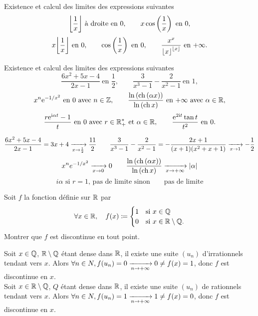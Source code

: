 \documentclass{magnolia}
\begin{document}

Existence et calcul des limites des expressions suivantes
\[\ent{\frac{1}{x}} \ \text{à droite en 0}, \qquad x\cos\p{\frac{1}{x}} \ \text{en 0},\]
\[x\ent{\frac{1}{x}} \ \text{en 0}, \qquad
  \cos\p{\frac{1}{x}} \ \text{en 0}, \qquad
  \frac{x^x}{\ent{x}^{\ent{x}}} \ \text{en $+\infty$}.\]

Existence et calcul des limites des expressions suivantes
\[\frac{6x^2+5x-4}{2x-1} \ \text{en $\frac{1}{2}$}, \qquad
  \frac{3}{x^3-1}-\frac{2}{x^2-1} \ \text{en 1},\]
\[x^n {\rm e}^{-1/x^2} \ \text{en 0 avec $n\in\mathbb{Z}$}, \qquad
  \frac{\ln\left(\operatorname{ch}\left(\alpha x\right)\right)}{\ln\left(\operatorname{ch} x\right)} \ \text{en $+\infty$ avec
  $\alpha\in\mathbb{R}$},\]
\[\frac{r {\rm e}^{{\rm i}\alpha t}-1}{t} \ \text{en 0 avec $r\in\mathbb{R}_+^*$ et $\alpha\in\mathbb{R}$},
  \qquad \frac{{\rm e}^{2{\rm i} t}\tan t}{t^2} \ \text{en 0}.\]
\begin{sol}
\[\frac{6x^2+5x-4}{2x-1}=3x+4\xrightarrow[x\rightarrow \frac{1}{2}]{}\frac{11}{2} \qquad
  \frac{3}{x^3-1}-\frac{2}{x^2-1}=-\frac{2x+1}{(x+1)(x^2+x+1)}\xrightarrow[x\rightarrow 1]{}-\frac{1}{2}\]
\[x^n e^{-1/x^2}\xrightarrow[x\rightarrow 0]{}0 \qquad
  \frac{\ln\left(\operatorname{ch}\left(\alpha x\right)\right)}{\ln\left(\operatorname{ch} x\right)}\xrightarrow[x\rightarrow +\infty]{}\left|\alpha\right|\]
\[i\alpha \text{ si $r=1$, pas de limite sinon} \qquad \text{pas de limite}\]
\end{sol}







Soit $f$ la fonction définie sur $\mathbb{R}$ par
\[\forall x\in\mathbb{R} ,\quad f(x)\coloneqq
  \begin{cases}
  1 & \text{si $x\in\mathbb{Q}$}\\
  0 & \text{si $x\in\mathbb{R}\setminus\mathbb{Q}$.}
  \end{cases}\]
Montrer que $f$ est discontinue en tout point.

\begin{sol}
  Soit $x\in \mathbb{Q}$, $\mathbb{R}\setminus\mathbb{Q}$ étant dense dans $\mathbb{R}$, il existe une suite $(u_n)$ d'irrationnels tendant vers $x$. Alors $\forall n \in N, f(u_n)=0\xrightarrow[n\rightarrow +\infty]{}0\neq f(x)=1$, donc $f$ est discontinue en $x$.\\
  Soit $x\in \mathbb{R}\setminus\mathbb{Q}$, $Q$ étant dense dans $\mathbb{R}$, il existe une suite $(u_n)$ de rationnels tendant vers $x$. Alors $\forall n \in N, f(u_n)=1\xrightarrow[n\rightarrow +\infty]{}1\neq f(x)=0$, donc $f$ est discontinue en $x$.
  \end{sol}
\end{document}
